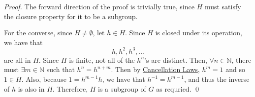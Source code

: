 \begin{proof}
  The forward direction of the proof is trivially true, since $H$ must satisfy the closure property for it to be a subgroup.

  For the converse, since $H \neq \emptyset$, let $h \in H$. Since $H$ is closed under its operation, we have that
  \begin{equation*}
    h, h^2, h^3, ...
  \end{equation*}
  are all in $H$. Since $H$ is finite, not all of the $h^n$'s are distinct. Then, $\forall n \in \mathbb{N}$, there must $\exists m \in \mathbb{N}$ such that $h^n = h^{n + m}$. Then by \hyperref[propo:cancellation_laws]{Cancellation Laws}, $h^m = 1$ and so $1 \in H$. Also, because $1 = h^{m - 1} h$, we have that $h^{-1} = h^{m - 1}$, and thus the inverse of $h$ is also in $H$. Therefore, $H$ is a subgroup of $G$ as requried. \qed
\end{proof}



